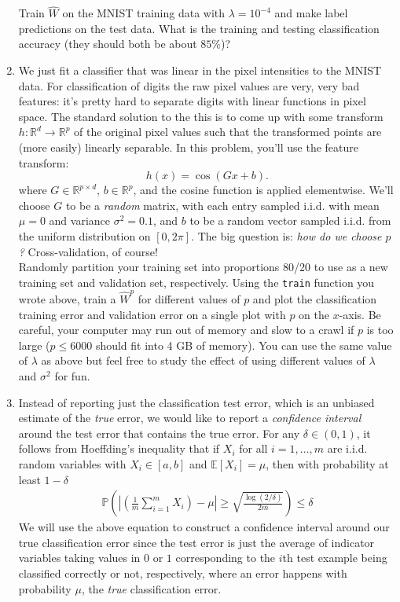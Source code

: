\documentclass{article}
\newcommand{\1}{\mathbf{1}}
\renewcommand{\P}{\mathbb{P}} %
\def\E{\mathbb{E}}
\def\P{\mathbb{P}}
\begin{document}
\begin{enumerate}
Train $\widehat{W}$ on the MNIST training data with $\lambda = 10^{-4}$ and make label predictions on the test data. What is the training and testing classification accuracy (they should both be about $85\%$)? 

\item We just fit a classifier that was linear in the pixel intensities to the MNIST data.
For classification of digits the raw pixel values are very, very bad features: it's pretty hard to separate digits with linear functions in pixel space.
The standard solution to the this is to come up with some transform $h : \mathbb{R}^d \rightarrow \mathbb{R}^p$ of the original pixel values such that the transformed points are (more easily) linearly separable.
In this problem, you'll use the feature transform:
\[
 h(x) = \cos(G x + b).
\]
where $G \in \mathbb{R}^{p \times d}$, $b \in \mathbb{R}^p$, and the cosine function is applied elementwise. 
We'll choose $G$ to be a \emph{random} matrix, with each entry sampled i.i.d. with mean $\mu=0$ and variance $\sigma^2=0.1$, and $b$ to be a random vector sampled i.i.d. from the uniform distribution on $[0,2\pi].$
The big question is: \emph{how do we choose $p$?} Cross-validation, of course!\\

Randomly partition your training set into proportions 80/20 to use as a new training set and validation set, respectively. 
Using the \verb|train| function you wrote above, train a $\widehat{W}^{p}$ for different values of $p$ and plot the classification training error and validation error on a single plot with $p$ on the $x$-axis. 
Be careful, your computer may run out of memory and slow to a crawl if $p$ is too large ($p\leq 6000$ should fit into 4 GB of memory). 
You can use the same value of $\lambda$ as above but feel free to study the effect of using different values of $\lambda$ and $\sigma^2$ for fun.

\item Instead of reporting just the classification test error, which is an unbiased estimate of the \emph{true} error, we would like to report a \emph{confidence interval} around the test error that contains the true error.
For any $\delta \in (0,1)$, it follows from Hoeffding's inequality that if $X_i$ for all $i=1,\dots,m$ are i.i.d. random variables with $X_i \in [a,b]$ and $\E[X_i] = \mu$, then with probability at least $1-\delta$ 
\begin{align*}
\P\left( \left| \left(\frac{1}{m} \sum_{i=1}^m X_i\right) - \mu \right| \geq \sqrt{\frac{\log(2/\delta)}{2m}} \right) \leq \delta
\end{align*}
We will use the above equation to construct a confidence interval around our true classification error since the test error is just the average of indicator variables taking values in $0$ or $1$ corresponding to the $i$th test example being classified correctly or not, respectively, where an error happens with probability $\mu$, the \emph{true} classification error. 


\end{enumerate}
\end{document}
